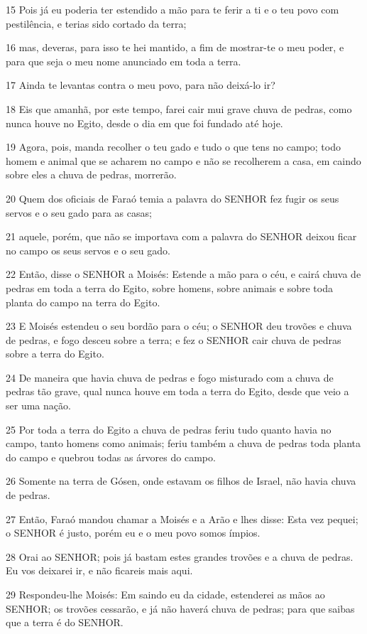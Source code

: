 \par 15 Pois já eu poderia ter estendido a mão para te ferir a ti e o teu povo com pestilência, e terias sido cortado da terra;
\par 16 mas, deveras, para isso te hei mantido, a fim de mostrar-te o meu poder, e para que seja o meu nome anunciado em toda a terra.
\par 17 Ainda te levantas contra o meu povo, para não deixá-lo ir?
\par 18 Eis que amanhã, por este tempo, farei cair mui grave chuva de pedras, como nunca houve no Egito, desde o dia em que foi fundado até hoje.
\par 19 Agora, pois, manda recolher o teu gado e tudo o que tens no campo; todo homem e animal que se acharem no campo e não se recolherem a casa, em caindo sobre eles a chuva de pedras, morrerão.
\par 20 Quem dos oficiais de Faraó temia a palavra do SENHOR fez fugir os seus servos e o seu gado para as casas;
\par 21 aquele, porém, que não se importava com a palavra do SENHOR deixou ficar no campo os seus servos e o seu gado.
\par 22 Então, disse o SENHOR a Moisés: Estende a mão para o céu, e cairá chuva de pedras em toda a terra do Egito, sobre homens, sobre animais e sobre toda planta do campo na terra do Egito.
\par 23 E Moisés estendeu o seu bordão para o céu; o SENHOR deu trovões e chuva de pedras, e fogo desceu sobre a terra; e fez o SENHOR cair chuva de pedras sobre a terra do Egito.
\par 24 De maneira que havia chuva de pedras e fogo misturado com a chuva de pedras tão grave, qual nunca houve em toda a terra do Egito, desde que veio a ser uma nação.
\par 25 Por toda a terra do Egito a chuva de pedras feriu tudo quanto havia no campo, tanto homens como animais; feriu também a chuva de pedras toda planta do campo e quebrou todas as árvores do campo.
\par 26 Somente na terra de Gósen, onde estavam os filhos de Israel, não havia chuva de pedras.
\par 27 Então, Faraó mandou chamar a Moisés e a Arão e lhes disse: Esta vez pequei; o SENHOR é justo, porém eu e o meu povo somos ímpios.
\par 28 Orai ao SENHOR; pois já bastam estes grandes trovões e a chuva de pedras. Eu vos deixarei ir, e não ficareis mais aqui.
\par 29 Respondeu-lhe Moisés: Em saindo eu da cidade, estenderei as mãos ao SENHOR; os trovões cessarão, e já não haverá chuva de pedras; para que saibas que a terra é do SENHOR.
